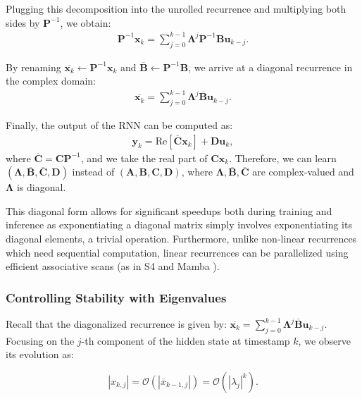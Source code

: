 \documentclass[12pt,a4paper]{report}
\begin{document}
\medskip

Plugging this decomposition into the unrolled recurrence and multiplying both sides by $\mathbf{P}^{-1}$, we obtain:
\[
\begin{aligned}
\mathbf{P}^{-1}\mathbf{x}_k = \sum^{k-1}_{j=0}\mathbf{\Lambda}^j \mathbf{P}^{-1} \mathbf{B} \mathbf{u}_{k-j}.
\end{aligned}
\]

By renaming $\overline{\mathbf{x}_k} \leftarrow \mathbf{P}^{-1}\mathbf{x}_k$ and $\overline{\mathbf{B}} \leftarrow \mathbf{P}^{-1}\mathbf{B}$, we arrive at a diagonal recurrence in the complex domain:
\[
\begin{aligned}
\overline{\mathbf{x}_k} = \sum^{k-1}_{j=0}\mathbf{\Lambda}^j\overline{\mathbf{B}} \mathbf{u}_{k-j}.
\end{aligned}
\]

Finally, the output of the RNN can be computed as:
\[
\begin{aligned}
\mathbf{y}_k = \text{Re}[\overline{\mathbf{C}}\mathbf{x}_k] + \mathbf{D}\mathbf{u}_k,
\end{aligned}
\]
where $\overline{\mathbf{C}} = \mathbf{C}\mathbf{P}^{-1}$, and we take the real part of $\mathbf{C}\mathbf{x}_k$. Therefore, we can learn $(\mathbf{\Lambda}, \overline{\mathbf{B}}, \overline{\mathbf{C}}, \mathbf{D})$ instead of $(\mathbf{A}, \mathbf{B}, \mathbf{C}, \mathbf{D})$, where $\mathbf{\Lambda},\overline{ \mathbf{B}}, \overline{\mathbf{C}}$ are complex-valued and $\mathbf{\Lambda}$ is diagonal.

\medskip

This diagonal form allows for significant speedups both during training and inference as exponentiating a diagonal matrix simply involves exponentiating its diagonal elements, a trivial operation. Furthermore, unlike non-linear recurrences which need sequential computation, linear recurrences can be parallelized using efficient associative scans (as in S4 \cite{s4} and Mamba \cite{mamba}).

\subsubsection{Controlling Stability with Eigenvalues}
Recall that the diagonalized recurrence is given by:
$\overline{\mathbf{x}_k} = \sum^{k-1}_{j=0}\mathbf{\Lambda}^j\overline{\mathbf{B}} \mathbf{u}_{k-j}$. Focusing on the $j$-th component of the hidden state at timestamp $k$, we observe its evolution as:

\[ |x_{k,j}| = \mathcal{O}(|\overline{x}_{k-1,j}|) = \mathcal{O}(|\lambda_j|^k). \]
\end{document}
